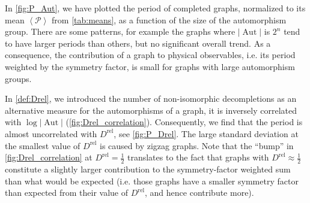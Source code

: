 \documentclass[11pt,a4paper]{article}
\newcommand{\abs}[1]{\lvert #1 \rvert}
\newcommand{\period}{\mathcal P}
\newcommand{\Aut}{\operatorname{Aut}}
\renewcommand{\|}{\rule[-0.4ex]{0.2ex}{1.2em}}
\begin{document}
In \cref{fig:P_Aut}, we have plotted the period of completed graphs, normalized to its mean $\left \langle \period \right \rangle $ from \cref{tab:means}, as a function of the size of the automorphism group. There are some patterns, for example the graphs where $\abs{\Aut}$ is $2^n$ tend to have larger periods than others, but no significant overall trend. As a consequence, the contribution of a graph to physical observables, i.e. its period weighted by the symmetry factor, is small for graphs with large automorphism groups.


In \cref{def:Drel}, we introduced the number of non-isomorphic decompletions
as an alternative measure for the automorphisms of a graph, it is inversely correlated with $\log \abs{\Aut}$ (\cref{fig:Drel_correlation}). Consequently, we find that the period is almost uncorrelated with $D^\text{rel}$, see \cref{fig:P_Drel}. The large standard deviation at the smallest value of $D^\text{rel}$ is caused by zigzag graphs. 
Note that the \enquote{bump} in \cref{fig:Drel_correlation} at $D^\text{rel}=\frac 12$ translates to the fact that  graphs with $D^\text{rel}\approx\frac 12$ constitute a slightly larger contribution to the symmetry-factor weighted sum than what would be expected (i.e. those graphs have a smaller symmetry factor than expected from their value of $D^\text{rel}$, and hence contribute more).
\end{document}
